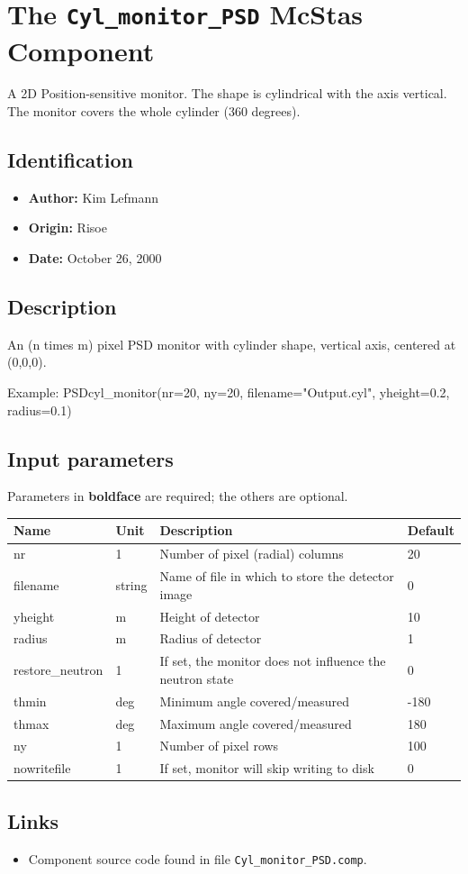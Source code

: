 \section{The \texttt{Cyl\_monitor\_PSD} McStas Component}
A 2D Position-sensitive monitor. The shape is cylindrical with
the axis vertical. The monitor covers the whole cylinder (360 degrees).

\subsection*{Identification}
\begin{itemize}
  \item \textbf{Author:} Kim Lefmann
  \item \textbf{Origin:} Risoe
  \item \textbf{Date:} October 26, 2000
\end{itemize}

\subsection*{Description}
An (n times m) pixel PSD monitor with cylinder shape, vertical axis, centered at (0,0,0).

Example: PSDcyl\_monitor(nr=20, ny=20, filename="Output.cyl", yheight=0.2, radius=0.1)

\subsection*{Input parameters}
Parameters in \textbf{boldface} are required; the others are optional.

\begin{longtable}{p{}p{}p{}p{}}
\toprule
\textbf{Name} & \textbf{Unit} & \textbf{Description} & \textbf{Default} \\
\midrule
\endhead
nr & 1 & Number of pixel (radial) columns & 20 \\
filename & string & Name of file in which to store the detector image & 0 \\
yheight & m & Height of detector & 10 \\
radius & m & Radius of detector & 1 \\
restore\_neutron & 1 & If set, the monitor does not influence the neutron state & 0 \\
thmin & deg & Minimum angle covered/measured & -180 \\
thmax & deg & Maximum angle covered/measured & 180 \\
ny & 1 & Number of pixel rows & 100 \\
nowritefile & 1 & If set, monitor will skip writing to disk & 0 \\
\bottomrule
\end{longtable}

\subsection*{Links}
\begin{itemize}
  \item Component source code found in file \texttt{Cyl\_monitor\_PSD.comp}.
\end{itemize}
